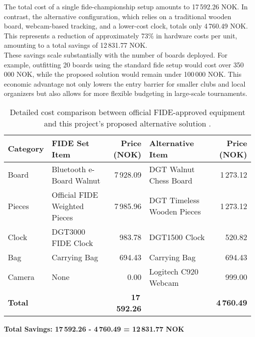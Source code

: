 The total cost of a single \gls{fide}-championship setup amounts to 17\,592.26 NOK. In contrast, the alternative configuration, which relies on a traditional wooden board, webcam-based tracking, and a lower-cost clock, totals only 4\,760.49 NOK. This represents a reduction of approximately 73\% in hardware costs per unit, amounting to a total savings of 12\,831.77 NOK. \\

These savings scale substantially with the number of boards deployed. For example, outfitting 20 boards using the standard \gls{fide} setup would cost over 350\,000 NOK, while the proposed solution would remain under 100\,000 NOK. This economic advantage not only lowers the entry barrier for smaller clubs and local organizers but also allows for more flexible budgeting in large-scale tournaments. \\

\begin{table}[h!]
\centering
\caption[Detailed cost comparison]{Detailed cost comparison between official FIDE-approved equipment and this project's proposed alternative solution \cite{dgtshop:prices}.}
\label{tab:detailed-price-comparison}
\begin{tabular}{lL{4cm}rL{4cm}r}
\toprule
\textbf{Category} & \textbf{FIDE Set Item} & \textbf{Price (NOK)} & \textbf{Alternative Item} & \textbf{Price (NOK)} \\
\midrule
Board & Bluetooth e-Board Walnut & 7\,928.09 & DGT Walnut Chess Board & 1\,273.12 \\
Pieces & Official FIDE Weighted Pieces & 7\,985.96 & DGT Timeless Wooden Pieces & 1\,273.12 \\
Clock & DGT3000 FIDE Clock & 983.78 & DGT1500 Clock & 520.82 \\
Bag & Carrying Bag & 694.43 & Carrying Bag & 694.43 \\
Camera & None & 0.00 & Logitech C920 Webcam & 999.00 \\
\midrule
\textbf{Total} & & \textbf{17\,592.26} & & \textbf{4\,760.49} \\
\bottomrule
\end{tabular}
\vspace{0.3cm}

\textbf{Total Savings: 17\,592.26 - 4\,760.49 = 12\,831.77 NOK}
\end{table}

